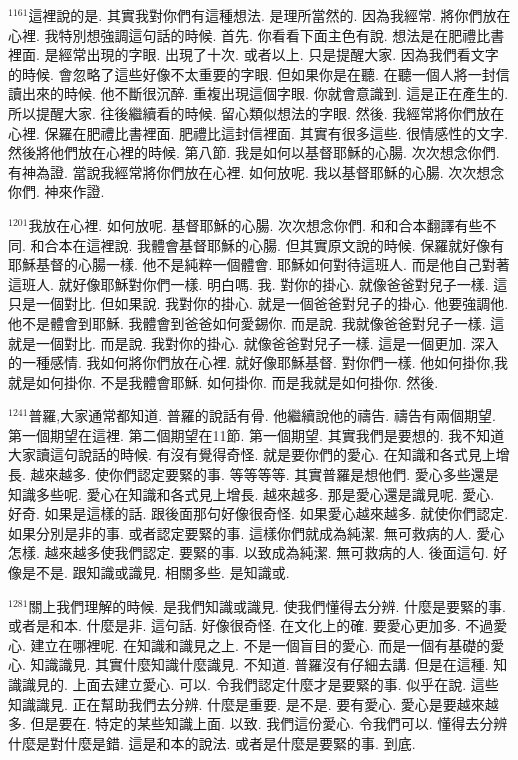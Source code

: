 \documentclass{book}
\begin{document}
$^{1161}$這裡說的是.
其實我對你們有這種想法.
是理所當然的.
因為我經常.
將你們放在心裡.
我特別想強調這句話的時候.
首先.
你看看下面主色有說.
想法是在肥禮比書裡面.
是經常出現的字眼.
出現了十次.
或者以上.
只是提醒大家.
因為我們看文字的時候.
會忽略了這些好像不太重要的字眼.
但如果你是在聽.
在聽一個人將一封信讀出來的時候.
他不斷很沉醉.
重複出現這個字眼.
你就會意識到.
這是正在產生的.
所以提醒大家.
往後繼續看的時候.
留心類似想法的字眼.
然後.
我經常將你們放在心裡.
保羅在肥禮比書裡面.
肥禮比這封信裡面.
其實有很多這些.
很情感性的文字.
然後將他們放在心裡的時候.
第八節.
我是如何以基督耶穌的心腸.
次次想念你們.
有神為證.
當說我經常將你們放在心裡.
如何放呢.
我以基督耶穌的心腸.
次次想念你們.
神來作證.

$^{1201}$我放在心裡.
如何放呢.
基督耶穌的心腸.
次次想念你們.
和和合本翻譯有些不同.
和合本在這裡說.
我體會基督耶穌的心腸.
但其實原文說的時候.
保羅就好像有耶穌基督的心腸一樣.
他不是純粹一個體會.
耶穌如何對待這班人.
而是他自己對著這班人.
就好像耶穌對你們一樣.
明白嗎.
我.
對你的掛心.
就像爸爸對兒子一樣.
這只是一個對比.
但如果說.
我對你的掛心.
就是一個爸爸對兒子的掛心.
他要強調他.
他不是體會到耶穌.
我體會到爸爸如何愛錫你.
而是說.
我就像爸爸對兒子一樣.
這就是一個對比.
而是說.
我對你的掛心.
就像爸爸對兒子一樣.
這是一個更加.
深入的一種感情.
我如何將你們放在心裡.
就好像耶穌基督.
對你們一樣.
他如何掛你,我就是如何掛你.
不是我體會耶穌.
如何掛你.
而是我就是如何掛你.
然後.

$^{1241}$普羅,大家通常都知道.
普羅的說話有骨.
他繼續說他的禱告.
禱告有兩個期望.
第一個期望在這裡.
第二個期望在11節.
第一個期望.
其實我們是要想的.
我不知道大家讀這句說話的時候.
有沒有覺得奇怪.
就是要你們的愛心.
在知識和各式見上增長.
越來越多.
使你們認定要緊的事.
等等等等.
其實普羅是想他們.
愛心多些還是知識多些呢.
愛心在知識和各式見上增長.
越來越多.
那是愛心還是識見呢.
愛心.
好奇.
如果是這樣的話.
跟後面那句好像很奇怪.
如果愛心越來越多.
就使你們認定.
如果分別是非的事.
或者認定要緊的事.
這樣你們就成為純潔.
無可救病的人.
愛心怎樣.
越來越多使我們認定.
要緊的事.
以致成為純潔.
無可救病的人.
後面這句.
好像是不是.
跟知識或識見.
相關多些.
是知識或.

$^{1281}$關上我們理解的時候.
是我們知識或識見.
使我們懂得去分辨.
什麼是要緊的事.
或者是和本.
什麼是非.
這句話.
好像很奇怪.
在文化上的確.
要愛心更加多.
不過愛心.
建立在哪裡呢.
在知識和識見之上.
不是一個盲目的愛心.
而是一個有基礎的愛心.
知識識見.
其實什麼知識什麼識見.
不知道.
普羅沒有仔細去講.
但是在這種.
知識識見的.
上面去建立愛心.
可以.
令我們認定什麼才是要緊的事.
似乎在說.
這些知識識見.
正在幫助我們去分辨.
什麼是重要.
是不是.
要有愛心.
愛心是要越來越多.
但是要在.
特定的某些知識上面.
以致.
我們這份愛心.
令我們可以.
懂得去分辨什麼是對什麼是錯.
這是和本的說法.
或者是什麼是要緊的事.
到底.
\end{document}
